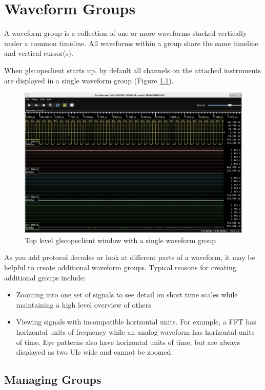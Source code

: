 \chapter{Waveform Groups}

A waveform group is a collection of one or more waveforms stacked vertically under a common timeline. All waveforms
within a group share the same timeline and vertical cursor(s).

When glscopeclient starts up, by default all channels on the attached instruments are displayed in a single waveform
group (Figure \ref{single-group}).

\begin{figure}[h]
\centering
\includegraphics[width=13cm]{images/overview.png}
\caption{Top level glscopeclient window with a single waveform group}
\label{single-group}
\end{figure}

As you add protocol decodes or look at different parts of a waveform, it may be helpful to create additional waveform
groups. Typical reasons for creating additional groups include:

\begin{itemize}
\item Zooming into one set of signals to see detail on short time scales while maintaining a high level overview of
others
\item Viewing signals with incompatible horizontal units. For example, a FFT has horizontal units of frequency while an
analog waveform has horizontal units of time. Eye patterns also have horizontal units of time, but are always displayed
as two UIs wide and cannot be zoomed.
\end{itemize}

\section{Managing Groups}

